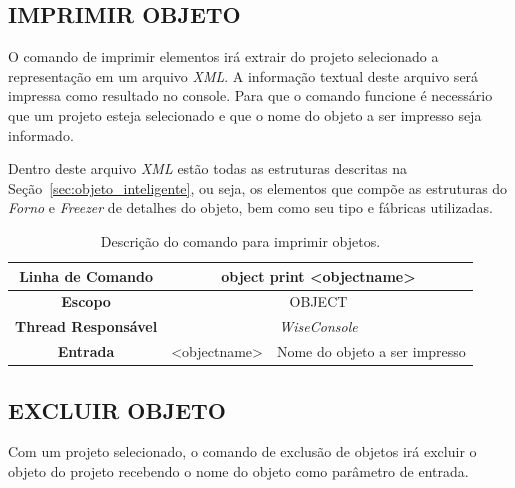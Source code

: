 \subsection{IMPRIMIR OBJETO}\label{sec:print_object}

O comando de imprimir elementos irá extrair do projeto selecionado a representação em um arquivo \textit{XML}. A informação textual deste arquivo será impressa como resultado no console. Para que o comando funcione é necessário que um projeto esteja selecionado e que o nome do objeto a ser impresso seja informado.

Dentro deste arquivo \textit{XML} estão todas as estruturas descritas na Seção~\ref{sec:objeto_inteligente}, ou seja, os elementos que compõe as estruturas do \textit{Forno} e \textit{Freezer} de detalhes do objeto, bem como seu tipo e fábricas utilizadas.

\begin{center}
	\begin{table}[!htbp]
		\begin{tabularx}{\textwidth}{c|c|X}
			\toprule
			\textbf{Linha de Comando} & \multicolumn{2}{c}{object print <object\underline{\space\space}name>} \\
			\midrule
			\textbf{Escopo} & \multicolumn{2}{c}{OBJECT} \\
			\hline
			\textbf{Thread Responsável} & \multicolumn{2}{c}{\textit{WiseConsole}} \\
			\hline
			\textbf{Entrada} & <object\underline{\space\space}name> & Nome do objeto a ser impresso \\
			\bottomrule
		\end{tabularx}
		\caption{Descrição do comando para imprimir objetos.}
		\label{tab:print_object}
	\end{table}
\end{center}

\subsection{EXCLUIR OBJETO}\label{sec:delete_object}

Com um projeto selecionado, o comando de exclusão de objetos irá excluir o objeto do projeto recebendo o nome do objeto como parâmetro de entrada.

